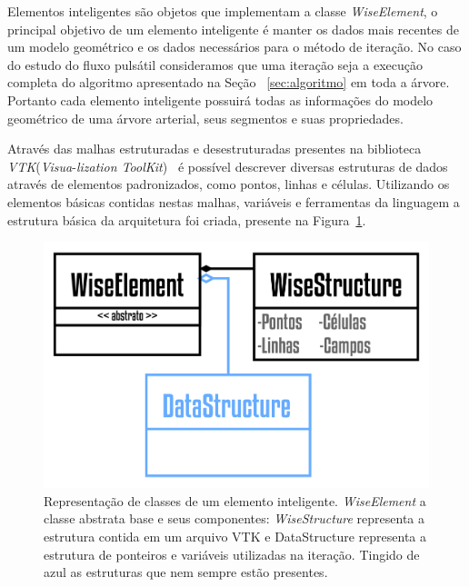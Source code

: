 Elementos inteligentes são objetos que implementam a classe \textit{WiseElement}, o principal objetivo de um elemento inteligente é manter os dados mais recentes de um modelo geométrico e os dados necessários para o método de iteração. No caso do estudo do fluxo pulsátil consideramos que uma iteração seja a execução completa do algoritmo apresentado na Seção~ \ref{sec:algoritmo} em toda a árvore. Portanto cada elemento inteligente possuirá todas as informações do modelo geométrico de uma árvore arterial, seus segmentos e suas propriedades.

Através das malhas estruturadas e desestruturadas presentes na biblioteca \textit{VTK}(\textit{Visua}-\textit{lization ToolKit})~\cite{VTKUSER} é possível descrever diversas estruturas de dados através de elementos padronizados, como pontos, linhas e células. Utilizando os elementos básicas contidas nestas malhas, variáveis e ferramentas da linguagem a estrutura básica da arquitetura foi criada, presente na Figura~\ref{fig2:wiselement}.

\begin{figure}[!htbp]
	\centering
	\includegraphics[scale=2]{Figures/WiseElement@16x.png}
	\caption{Representação de classes de um elemento inteligente. \textit{WiseElement} a classe abstrata base e seus componentes: \textit{WiseStructure} representa a estrutura contida em um arquivo VTK e DataStructure representa a estrutura de ponteiros e variáveis utilizadas na iteração. Tingido de azul as estruturas que nem sempre estão presentes.}
	\label{fig2:wiselement}
\end{figure}

